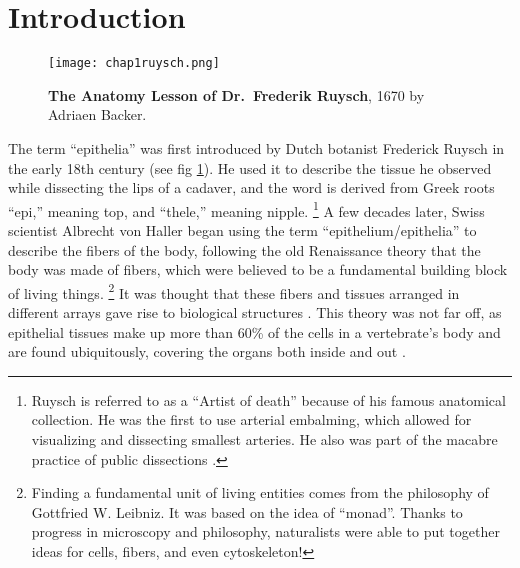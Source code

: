

\hypertarget{introduction}{%
	\section{Introduction}\label{introduction}}

\begin{figure}[h!]
	\centering
	\texttt{[image: chap1ruysch.png]}
	\caption{\label{fig_1_1} \textbf{The Anatomy Lesson of Dr.~Frederik Ruysch}, 1670 by
		Adriaen Backer. \cite{ruyshc}}
\end{figure}

The term ``epithelia'' was first introduced by Dutch botanist Frederick Ruysch in the early 18th century (see fig \ref{fig_1_1}). He used it to describe the tissue he observed while dissecting the lips of a cadaver, and the word is derived from Greek roots ``epi,'' meaning top, and ``thele,'' meaning nipple.
\footnote{Ruysch is referred to as a ``Artist of death'' because of his famous anatomical collection. He was the first to use arterial embalming, which allowed for visualizing and dissecting smallest
	arteries. He also was part of the macabre practice of public dissections \cite{halley2019}.}
A few decades later, Swiss scientist Albrecht von Haller began using the term ``epithelium/epithelia'' to describe the fibers of the body, following the old Renaissance theory that the body was made of fibers, which were believed to be a fundamental building block of living things.
\footnote{Finding a fundamental unit of living entities comes from the philosophy of Gottfried W. Leibniz. It was based on the idea of ``monad''. Thanks to progress in microscopy and philosophy, naturalists were able to put together ideas for cells, fibers, and even cytoskeleton!\cite{zampieri2014}}
It was thought that these fibers and tissues arranged in different arrays gave rise to biological structures \cite{maccord2012, zampieri2014}. This theory was not far off, as epithelial tissues make up more than 60\% of the cells in a vertebrate's body and are found ubiquitously, covering the organs both inside and out \cite{alberts2015}.


